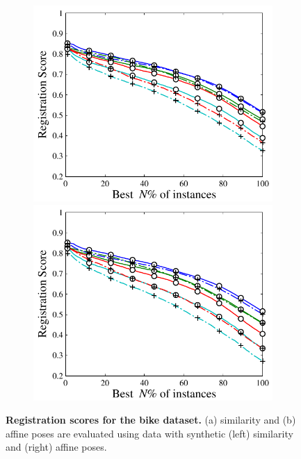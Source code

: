 \begin{figure}[ht]
	\begin{subfigure}[b]{0.48\linewidth}
		\includegraphics[width=\linewidth]{fig/reg/reg2d_affsim.pdf}
		\includegraphics[width=\linewidth]{fig/reg/reg2d_affaff.pdf}
	\end{subfigure}
	\caption{\textbf{Registration scores for the \textbf{bike} dataset.} (a) similarity and (b) affine poses are evaluated using data with synthetic (left) similarity and (right) affine poses.}
	\label{fig/reg/regresult2d}
\end{figure}

